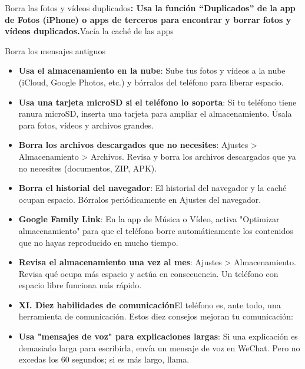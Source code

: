 Borra las fotos y vídeos duplicados\textbf{: Usa la función “Duplicados” de la app de Fotos (iPhone) o apps de terceros para encontrar y borrar fotos y vídeos duplicados.}Vacía la caché de las apps


Borra los mensajes antiguos


\begin{itemize}
  \item \textbf{Usa el almacenamiento en la nube}: Sube tus fotos y vídeos a la nube (iCloud, Google Photos, etc.) y bórralos del teléfono para liberar espacio.
  \item \textbf{Usa una tarjeta microSD si el teléfono lo soporta}: Si tu teléfono tiene ranura microSD, inserta una tarjeta para ampliar el almacenamiento. Úsala para fotos, vídeos y archivos grandes.
  \item \textbf{Borra los archivos descargados que no necesites}: Ajustes > Almacenamiento > Archivos. Revisa y borra los archivos descargados que ya no necesites (documentos, ZIP, APK).
  \item \textbf{Borra el historial del navegador}: El historial del navegador y la caché ocupan espacio. Bórralos periódicamente en Ajustes del navegador.
\end{itemize}


\begin{itemize}
  \item \textbf{Google Family Link}: En la app de Música o Vídeo, activa "Optimizar almacenamiento" para que el teléfono borre automáticamente los contenidos que no hayas reproducido en mucho tiempo.
  \item \textbf{Revisa el almacenamiento una vez al mes}: Ajustes > Almacenamiento. Revisa qué ocupa más espacio y actúa en consecuencia. Un teléfono con espacio libre funciona más rápido.
  \item \textbf{XI. Diez habilidades de comunicación}El teléfono es, ante todo, una herramienta de comunicación. Estos diez consejos mejoran tu comunicación:
  \item \textbf{Usa "mensajes de voz" para explicaciones largas}: Si una explicación es demasiado larga para escribirla, envía un mensaje de voz en WeChat. Pero no excedas los 60 segundos; si es más largo, llama.
\end{itemize}

